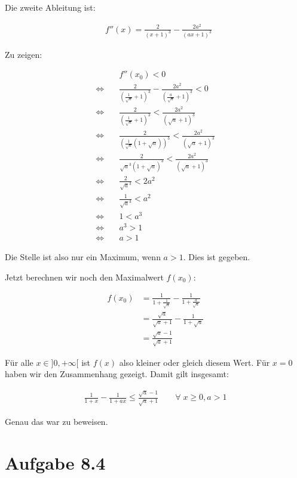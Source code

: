 \documentclass[a4paper,german,12pt,smallheadings]{scrartcl}
\begin{document}
Die zweite Ableitung ist:

\begin{align*}
  &f''(x) = \frac{2}{(x+1)^3} - \frac{2a^2}{(ax+1)^3}
\end{align*}

Zu zeigen:

\begin{align*}
  &f''(x_0) < 0\\
  \Leftrightarrow\quad&\frac{2}{(\frac{1}{\sqrt{a}}+1)^3} - \frac{2a^2}{(\frac{a}{\sqrt{a}}+1)^3} < 0 \\
  \Leftrightarrow\quad&\frac{2}{(\frac{1}{\sqrt{a}}+1)^3} < \frac{2a^2}{(\sqrt{a}+1)^3} \\
  \Leftrightarrow\quad&\frac{2}{(\frac{1}{\sqrt{a}}(1+\sqrt{a}))^3} < \frac{2a^2}{(\sqrt{a}+1)^3} \\
  \Leftrightarrow\quad&\frac{2}{\sqrt{a}^3 (1+\sqrt{a})^3} < \frac{2a^2}{(\sqrt{a}+1)^3} \\
  \Leftrightarrow\quad&\frac{2}{\sqrt{a}^3} < 2a^2 \\
  \Leftrightarrow\quad&\frac{1}{\sqrt{a}^3} < a^2 \\
  \Leftrightarrow\quad& 1 < a^3 \\
  \Leftrightarrow\quad& a^3 > 1\\
  \Leftrightarrow\quad& a > 1
\end{align*}

Die Stelle ist also nur ein Maximum, wenn $a > 1$. Dies ist gegeben.

Jetzt berechnen wir noch den Maximalwert $f(x_0)$:

\begin{align*}
  f(x_0) &= \frac{1}{1+\frac{1}{\sqrt{a}}} - \frac{1}{1+\frac{a}{\sqrt{a}}} \\
         &= \frac{\sqrt{a}}{\sqrt{a}+1} - \frac{1}{1+\sqrt{a}} \\
         &= \frac{\sqrt{a} - 1}{\sqrt{a}+1}
\end{align*}

Für alle $x \in ]0, +\infty[$ ist $f(x)$ also kleiner oder gleich diesem Wert.
Für $x=0$ haben wir den Zusammenhang gezeigt. Damit gilt insgesamt:

\begin{align*}
  \frac{1}{1+x} - \frac{1}{1+ax} \leq \frac{\sqrt{a} - 1}{\sqrt{a}+1} \qquad \forall\; x \geq 0, a > 1
\end{align*}

Genau das war zu beweisen.

\section*{Aufgabe 8.4}
\end{document}

